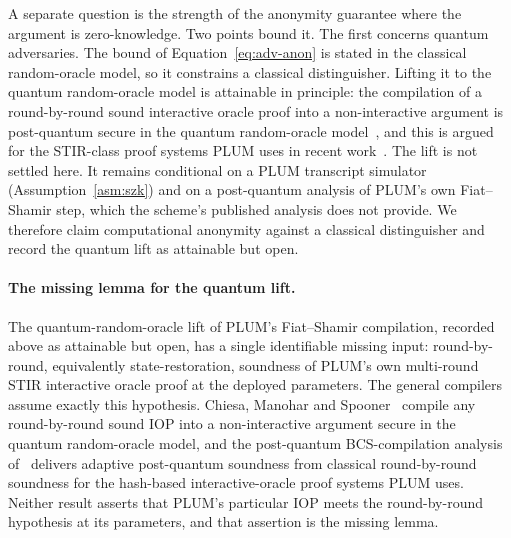 A separate question is the strength of the anonymity guarantee where the argument is zero-knowledge. Two points bound it. The first concerns quantum adversaries. The bound of Equation~\eqref{eq:adv-anon} is stated in the classical random-oracle model, so it constrains a classical distinguisher. Lifting it to the quantum random-oracle model is attainable in principle: the compilation of a round-by-round sound interactive oracle proof into a non-interactive argument is post-quantum secure in the quantum random-oracle model~\cite{cryptoeprint:2019/834}, and this is argued for the {STIR}-class proof systems PLUM uses in recent work~\cite{cryptoeprint:2025/2166}. The lift is not settled here. It remains conditional on a PLUM transcript simulator (Assumption~\ref{asm:szk}) and on a post-quantum analysis of PLUM's own Fiat--Shamir step, which the scheme's published analysis does not provide. We therefore claim computational anonymity against a classical distinguisher and record the quantum lift as attainable but open.

\paragraph{The missing lemma for the quantum lift.}
The quantum-random-oracle lift of PLUM's Fiat--Shamir compilation, recorded above as attainable but open, has a single identifiable missing input: round-by-round, equivalently state-restoration, soundness of PLUM's own multi-round STIR interactive oracle proof at the deployed parameters. The general compilers assume exactly this hypothesis. Chiesa, Manohar and Spooner~\cite{cryptoeprint:2019/834} compile any round-by-round sound IOP into a non-interactive argument secure in the quantum random-oracle model, and the post-quantum BCS-compilation analysis of~\cite{cryptoeprint:2025/2166} delivers adaptive post-quantum soundness from classical round-by-round soundness for the hash-based interactive-oracle proof systems PLUM uses. Neither result asserts that PLUM's particular IOP meets the round-by-round hypothesis at its parameters, and that assertion is the missing lemma.

